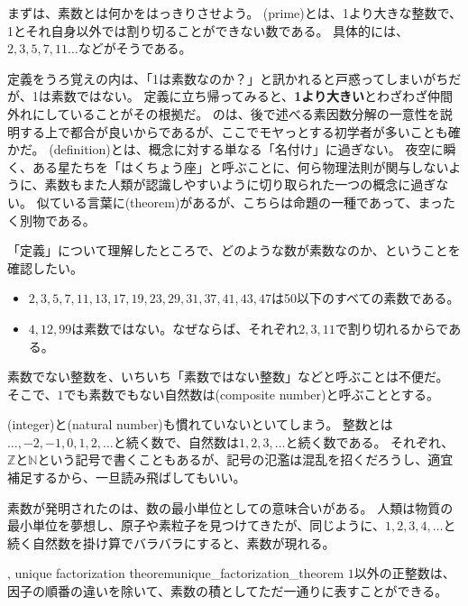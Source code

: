 まずは、素数とは何かをはっきりさせよう。
(prime)とは、1より大きな整数で、1とそれ自身以外では割り切ることができない数である。
具体的には、$2,3,5,7,11\ldots$などがそうである。

定義をうろ覚えの内は、「1は素数なのか？」と訊かれると戸惑ってしまいがちだが、1は素数ではない。
定義に立ち帰ってみると、\textbf{1より大きい}とわざわざ仲間外れにしていることがその根拠だ。
のは、後で述べる素因数分解の一意性を説明する上で都合が良いからであるが、ここでモヤっとする初学者が多いことも確かだ。
(definition)とは、概念に対する単なる「名付け」に過ぎない。
夜空に瞬く、ある星たちを「はくちょう座」と呼ぶことに、何ら物理法則が関与しないように、素数もまた人類が認識しやすいように切り取られた一つの概念に過ぎない。
似ている言葉に(theorem)があるが、こちらは命題の一種であって、まったく別物である。

「定義」について理解したところで、どのような数が素数なのか、ということを確認したい。

\begin{itemize}
 \item $2, 3, 5, 7, 11, 13, 17, 19, 23, 29, 31, 37, 41, 43, 47$は50以下のすべての素数である。
 \item $4, 12, 99$は素数ではない。なぜならば、それぞれ$2, 3, 11$で割り切れるからである。
\end{itemize}

素数でない整数を、いちいち「素数ではない整数」などと呼ぶことは不便だ。
そこで、$1$でも素数でもない自然数は(composite number)と呼ぶこととする。

(integer)と(natural number)も慣れていないといてしまう。
整数とは$\ldots,-2,-1,0,1,2,\ldots$と続く数で、自然数は$1,2,3,\ldots$と続く数である。
それぞれ、$\mathbb{Z}$と$\mathbb{N}$という記号で書くこともあるが、記号の氾濫は混乱を招くだろうし、適宜補足するから、一旦読み飛ばしてもいい。

素数が発明されたのは、数の最小単位としての意味合いがある。
人類は物質の最小単位を夢想し、原子や素粒子を見つけてきたが、同じように、$1,2,3,4,\ldots$と続く自然数を掛け算でバラバラにすると、素数が現れる。

\begin{Theo}{, unique factorization theorem}{unique_factorization_theorem}
$1$以外の正整数は、因子の順番の違いを除いて、素数の積としてただ一通りに表すことができる。
\end{Theo}

